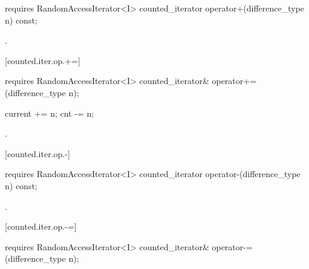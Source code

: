 \begin{addedblock}
%
%
\begin{itemdecl}
requires RandomAccessIterator<I>
  counted_iterator operator+(difference_type n) const;
\end{itemdecl}

\begin{itemdescr}
\pnum
\requires {}

\pnum
\returns {}.
\end{itemdescr}

[counted.iter.op.+=]{}

%
%
\begin{itemdecl}
requires RandomAccessIterator<I>
  counted_iterator& operator+=(difference_type n);
\end{itemdecl}

\begin{itemdescr}
\pnum
\requires {}

\pnum
\effects
\begin{codeblock}
current += n;
cnt -= n;
\end{codeblock}

\pnum
\returns {}.
\end{itemdescr}

[counted.iter.op.-]{}

%
%
\begin{itemdecl}
requires RandomAccessIterator<I>
  counted_iterator operator-(difference_type n) const;
\end{itemdecl}

\begin{itemdescr}
\pnum
\requires {}

\pnum
\returns {}.
\end{itemdescr}

[counted.iter.op.-=]{}

%
%
\begin{itemdecl}
requires RandomAccessIterator<I>
  counted_iterator& operator-=(difference_type n);
\end{itemdecl}


\end{addedblock}
